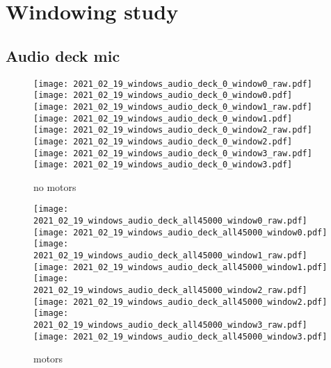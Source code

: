 \section{Windowing study}

\subsection{Audio deck mic}
\begin{figure}[h]
  \centering
  \begin{minipage}{\textwidth}
  \centering
  \texttt{[image: 2021\_02\_19\_windows\_audio\_deck\_0\_window0\_raw.pdf]}
  \texttt{[image: 2021\_02\_19\_windows\_audio\_deck\_0\_window0.pdf]}
  \texttt{[image: 2021\_02\_19\_windows\_audio\_deck\_0\_window1\_raw.pdf]}
  \texttt{[image: 2021\_02\_19\_windows\_audio\_deck\_0\_window1.pdf]}
  \texttt{[image: 2021\_02\_19\_windows\_audio\_deck\_0\_window2\_raw.pdf]}
  \texttt{[image: 2021\_02\_19\_windows\_audio\_deck\_0\_window2.pdf]}
  \texttt{[image: 2021\_02\_19\_windows\_audio\_deck\_0\_window3\_raw.pdf]}
  \texttt{[image: 2021\_02\_19\_windows\_audio\_deck\_0\_window3.pdf]}
  \end{minipage}
  \caption{no motors}
  \label{fig:audio_deck-no-motors}
\end{figure}

\begin{figure}[h]
  \centering
  \begin{minipage}{\textwidth}
  \centering
  \texttt{[image: 2021\_02\_19\_windows\_audio\_deck\_all45000\_window0\_raw.pdf]}
  \texttt{[image: 2021\_02\_19\_windows\_audio\_deck\_all45000\_window0.pdf]}
  \texttt{[image: 2021\_02\_19\_windows\_audio\_deck\_all45000\_window1\_raw.pdf]}
  \texttt{[image: 2021\_02\_19\_windows\_audio\_deck\_all45000\_window1.pdf]}
  \texttt{[image: 2021\_02\_19\_windows\_audio\_deck\_all45000\_window2\_raw.pdf]}
  \texttt{[image: 2021\_02\_19\_windows\_audio\_deck\_all45000\_window2.pdf]}
  \texttt{[image: 2021\_02\_19\_windows\_audio\_deck\_all45000\_window3\_raw.pdf]}
  \texttt{[image: 2021\_02\_19\_windows\_audio\_deck\_all45000\_window3.pdf]}
  \end{minipage}
  \caption{motors}
  \label{fig:audio_deck-motors}
\end{figure}


